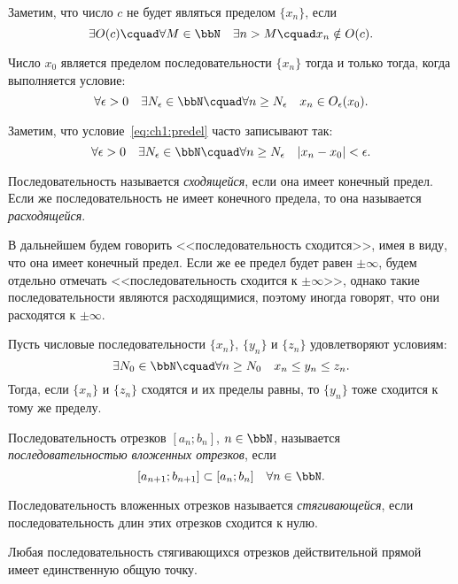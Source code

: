 Заметим, что число $c$ не будет являться пределом $\{x_n\}$, если 
$$
\exists O(c)\cquad \forall M \in \bbN\quad \exists n > M\cquad x_n \notin O(c).
$$
\begin{lemm}
Число $x_0$ является пределом последовательности $\{x_n\}$ тогда и только тогда, когда выполняется условие:
\begin{equation}
\label{eq:ch1:predel}
\forall \epsilon>0\quad \exists N_\epsilon \in \bbN\cquad \forall n \ge N_\epsilon\quad x_n \in O_\epsilon(x_0).
\end{equation}
\end{lemm}
Заметим, что условие~\eqref{eq:ch1:predel} часто записывают так:
$$
\forall \epsilon>0\quad \exists N_\epsilon \in \bbN\cquad \forall n \ge N_\epsilon\quad |x_n-x_0|<\epsilon.
$$
\begin{defn}
Последовательность называется \textit{сходящейся}, если она имеет конечный предел. Если же последовательность не имеет конечного предела, то она называется \textit{расходящейся}.
\end{defn}
В дальнейшем будем говорить <<последовательность сходится>>, имея в виду, что она имеет конечный предел. Если же ее предел будет равен $\pm\infty$, будем отдельно отмечать <<последовательность сходится к $\pm\infty$>>, однако такие последовательности являются расходящимися, поэтому иногда говорят, что они расходятся к $\pm\infty$. 
\begin{thm} \label{th:ch1:otrehposled}  
Пусть числовые последовательности $\{x_n\}$, $\{y_n\}$ и $\{z_n\}$ удовлетворяют условиям:
$$
\exists N_0 \in \bbN\cquad \forall n\ge N_0 \quad x_n \le y_n \le z_n.
$$
Тогда, если $\{x_n\}$ и $\{z_n\}$ сходятся и их пределы равны, то $\{y_n\}$ тоже сходится к тому же пределу.
\end{thm}

\begin{defn}
Последовательность отрезков $[a_n;b_n]$, $n \in \bbN$, называется \textit{последовательностью вложенных отрезков}, если
$$
[a_{n+1};b_{n+1}]\subset [a_n;b_n]\quad \forall n \in \bbN.
$$
\end{defn}

\begin{defn}
Последовательность вложенных отрезков называется \textit{стягивающейся}, если последовательность длин этих отрезков сходится к нулю.
\end{defn}

\begin{thm}
\label{th:ch1:poslstyag}
Любая последовательность стягивающихся отрезков действительной прямой имеет единственную общую точку.
\end{thm}

